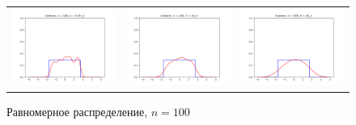 	\begin{figure}[H]
	\centering
	\begin{tabular}{ccc}
		\includegraphics[width=55mm, height =0.25\textheight]{pics/ker_u_100_1.png}
		&
		\includegraphics[width=55mm, height =0.25\textheight]{pics/ker_u_100_2.png}
		&
		\includegraphics[width=55mm, height =0.25\textheight]{pics/ker_u_100_3.png}
	\end{tabular}
	\caption{Равномерное распределение, $n = 100$}
	\label{fig:uniform}
	\end{figure}
	
